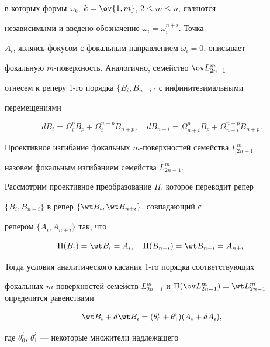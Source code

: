 в которых формы $\omega_k$, $k=\ov{1,m}$, $2\le m\le n$, являются 


независимыми и введено обозначение $\omega_i=\omega^{n+i}_i$. Точка 


$A_i$, являясь фокусом с фокальным направлением $\omega_i=0$, описывает 


фокальную $m$-поверхность. Аналогично, семейство $\ov L{}^m_{2n-1}$ 


отнесем к реперу 1-го порядка $\{B_i,B_{n+i}\}$ с инфинитезимальными 


перемещениями 


$$ 


d B_i=\Omega^p_i B_p+\Omega^{n+p}_i B_{n+p},\quad 


d B_{n+i}=\Omega^p_{n+i}B_p+\Omega^{n+p}_{n+i}B_{n+p}. 


$$ 


 


\begin{defnnonum} 


Проективное изгибание фокальных $m$-поверхностей семейства $L^m_{2n-1}$ 


назовем фокальным изгибанием семейства $L^m_{2n-1}$. 


\end{defnnonum} 


 


Рассмотрим проективное преобразование $\Pi$, которое переводит репер 


$\{B_i,B_{n+i}\}$ в репер $\{\wt B_i,\wt B_{n+i}\}$, совпадающий с 


репером $\{A_i,A_{n+i}\}$ так, что 


$$ 


\Pi(B_i)=\wt B_i=A_i,\quad \Pi(B_{n+i})=\wt B_{n+i}=A_{n+i}. 


$$ 


Тогда условия аналитического касания 1-го порядка соответствующих 


фокальных $m$-по\-верх\-нос\-тей семейств $L^m_{2n-1}$ и $\Pi(\ov 


L{}^m_{2n-1})=\wt L{}^m_{2n-1}$ определятся равенствами 


\begin{equation} 


\wt B_i+d\wt B_i=(\theta^i_0+\theta^i_1)(A_i+d A_i), 


\end{equation} 


где $\theta^i_0$, $\theta^i_1$ --- некоторые множители надлежащего 


